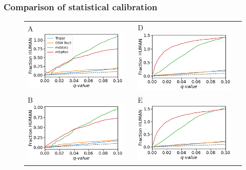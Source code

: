 \documentclass[11pt]{article}
\begin{document}
\subsubsection*{Comparison of statistical calibration}
\begin{figure}[hbt]
    \centering
    \centering
    \begin{tabular}{lclc} 
        A \includegraphics[width=0.5\linewidth]{../../result/report_plots/osw_FP_DE_yeast.png} & &%
        D \includegraphics[width=0.5\linewidth]{../../result/report_plots/diann_FP_DE_yeast.png} & \\%
        B \includegraphics[width=0.5\linewidth]{../../result/report_plots/osw_FP_DE_ecoli.png} & &%
        E \includegraphics[width=0.5\linewidth]{../../result/report_plots/diann_FP_DE_ecoli.png} & \\%

\end{tabular}
\end{figure}
\end{document}
